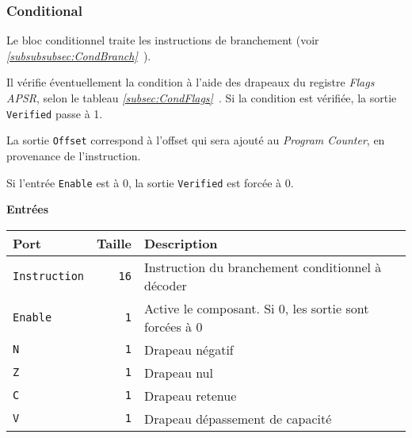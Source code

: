\documentclass{article}
\begin{document}
    \subsubsection{Conditional}
    \label{sec:Conditional}

    Le bloc conditionnel traite les instructions de branchement (voir \textit{\ref{subsubsubsec:CondBranch}~}).

    Il vérifie éventuellement la condition à l'aide des drapeaux du registre \textit{Flags APSR}, selon le tableau  \textit{\ref{subsec:CondFlags}~}.
    Si la condition est vérifiée, la sortie \texttt{Verified} passe à 1.

    La sortie \texttt{Offset} correspond à l'offset qui sera ajouté au \textit{Program Counter}, en provenance de l'instruction.

    Si l'entrée \texttt{Enable} est à 0, la sortie \texttt{Verified} est forcée à 0.


    \textbf{Entrées}\\

    \begin{tabular}{|l|r|l|}
        \hline
        \textbf{Port}        & \textbf{Taille} & \textbf{Description}                              \\
        \hline

        \texttt{Instruction} & \texttt{16}     & Instruction du branchement conditionnel à décoder \\
        \hline
        \texttt{Enable} & \texttt{1} & Active le composant.
        Si 0, les sortie sont forcées à 0 \\
        \hline
        \texttt{N}           & \texttt{1}      & Drapeau négatif                                   \\
        \hline
        \texttt{Z}           & \texttt{1}      & Drapeau nul                                       \\
        \hline
        \texttt{C}           & \texttt{1}      & Drapeau retenue                                   \\
        \hline
        \texttt{V}           & \texttt{1}      & Drapeau dépassement de capacité                   \\


        \hline
    \end{tabular}
\end{document}
